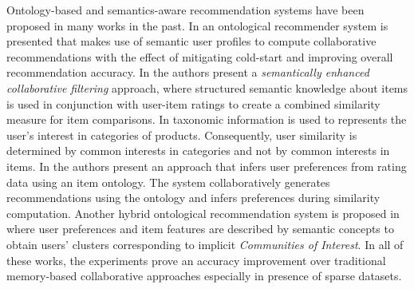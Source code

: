 Ontology-based and semantics-aware recommendation systems have been proposed in many works in the past. 
In \citep{Middleton_2009} an ontological recommender system is presented that makes use of semantic user profiles to compute collaborative recommendations with the effect of mitigating cold-start and improving overall recommendation accuracy. 
In \citep{mobasher2004} the authors present a \textit{semantically enhanced collaborative filtering} approach, where structured semantic knowledge about items is used in conjunction with user-item ratings to create a combined similarity measure for item comparisons. 
In \citep{Ziegler2004} taxonomic information is used to represents the user's interest in categories of products. Consequently, user similarity is determined by common interests in categories and not by common interests in items. 
In \citep{Anand2007} the authors present an approach that infers user preferences from rating data using an item ontology. The system collaboratively generates recommendations using the ontology and infers preferences during similarity computation. 
Another hybrid ontological recommendation system is proposed in \citep{Cantador08amultilayer} where user preferences and item features are described by semantic concepts to obtain users' clusters corresponding to implicit \textit{Communities of Interest}.
In all of these works, the experiments prove an accuracy improvement over traditional memory-based collaborative approaches especially in presence of sparse datasets. 

